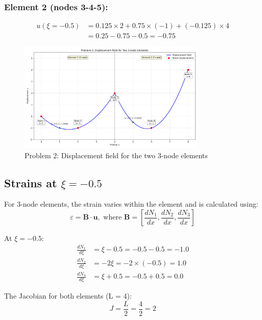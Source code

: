 \documentclass[12pt,a4paper]{article}
\begin{document}
\subsubsection*{Element 2 (nodes 3-4-5):}
\begin{align}
u(\xi=-0.5) &= 0.125 \times 2 + 0.75 \times (-1) + (-0.125) \times 4 \\
&= 0.25 - 0.75 - 0.5 = -0.75
\end{align}

\begin{figure}[H]
\centering
\includegraphics[width=0.8\textwidth]{figures/ps3_problem2_displacement.png}
\caption{Problem 2: Displacement field for the two 3-node elements}
\label{fig:problem2_displacement}
\end{figure}

\subsection{Strains at $\xi = -0.5$}
For 3-node elements, the strain varies within the element and is calculated using:
\begin{equation}
\varepsilon = \mathbf{B} \cdot \mathbf{u}, \text{ where } \mathbf{B} = \left[\frac{dN_1}{dx}, \frac{dN_2}{dx}, \frac{dN_3}{dx}\right]
\end{equation}

At $\xi = -0.5$:
\begin{align}
\frac{dN_1}{d\xi} &= \xi - 0.5 = -0.5 - 0.5 = -1.0 \\
\frac{dN_2}{d\xi} &= -2\xi = -2 \times (-0.5) = 1.0 \\
\frac{dN_3}{d\xi} &= \xi + 0.5 = -0.5 + 0.5 = 0.0
\end{align}

The Jacobian for both elements (L = 4):
\begin{equation}
J = \frac{L}{2} = \frac{4}{2} = 2
\end{equation}
\end{document}
